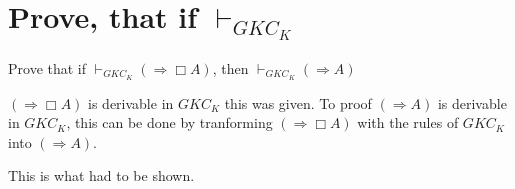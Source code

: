 \documentclass{article}
\begin{document}
\section{Prove, that if $\vdash_{GKC_K}$}

Prove that if $\vdash_{GKC_K}(\Rightarrow \Box A)$, then
$\vdash_{GKC_K}(\Rightarrow A)$

$(\Rightarrow \Box A)$ is derivable in $GKC_K$ this was given.
To proof $(\Rightarrow A)$ is derivable in $GKC_K$, this can be done by
tranforming $(\Rightarrow \Box A)$ with the rules of $GKC_K$ into 
$(\Rightarrow A)$.

\begin{prooftree}
\end{prooftree}

This is what had to be shown.
\end{document}
